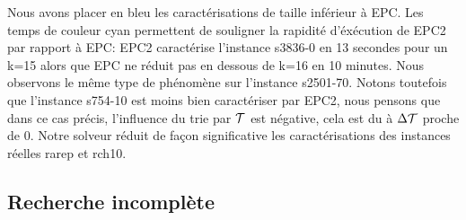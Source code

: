 Nous avons placer en bleu les caractérisations de taille inférieur à EPC. Les temps de couleur cyan permettent de souligner la rapidité d'éxécution de EPC2 par rapport à EPC:  EPC2 caractérise l'instance s3836-0 en 13 secondes pour un k=15 alors que EPC ne réduit pas en dessous de k=16 en 10 minutes. Nous observons le même type de phénomène sur l'instance s2501-70. Notons toutefois que l'instance s754-10 est moins bien caractériser par EPC2, nous pensons que dans ce cas précis, l'influence du trie par $\cal{T}$ est négative, cela est du à $\Delta\cal{T}$ proche de 0. Notre solveur réduit de façon significative les caractérisations des instances réelles rarep et rch10. 


\subsection{Recherche incomplète}
